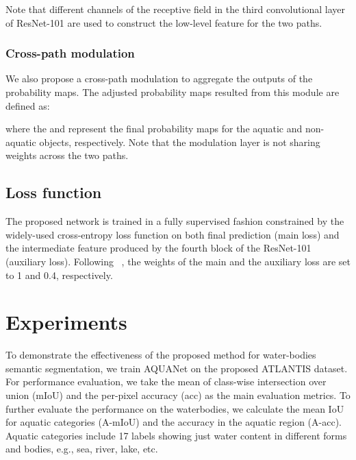 \documentclass{article}
\begin{document}
Note that different channels of the receptive field in the third convolutional layer of ResNet-101 are used to construct the low-level feature  for the two paths.

\subsubsection{Cross-path modulation}
We also propose a cross-path modulation to aggregate the outputs of the probability maps. The adjusted probability maps resulted from this module are defined as:


where the  and  represent the final probability maps for the aquatic and non-aquatic objects, respectively. Note that the modulation layer is not sharing weights across the two paths.

\subsection{Loss function}

The proposed network is trained in a fully supervised fashion constrained by the widely-used cross-entropy loss function on both final prediction  (main loss) and the intermediate feature produced by the fourth block of the ResNet-101 (auxiliary loss). Following \citeauthor{zhao2017pyramid}~\cite{zhao2017pyramid}, the weights of the main and the auxiliary loss are set to 1 and 0.4, respectively.

\section{Experiments}

To demonstrate the effectiveness of the proposed method for water-bodies semantic segmentation, we train AQUANet on the proposed ATLANTIS dataset.
For performance evaluation, we take the mean of class-wise intersection over union (mIoU) and the per-pixel accuracy (acc) as the main evaluation metrics.
To further evaluate the performance on the waterbodies, we calculate the mean IoU for aquatic categories (A-mIoU) and the accuracy in the aquatic region (A-acc). Aquatic categories include 17 labels showing just water content in different forms and bodies, e.g., sea, river, lake, etc.
\end{document}
